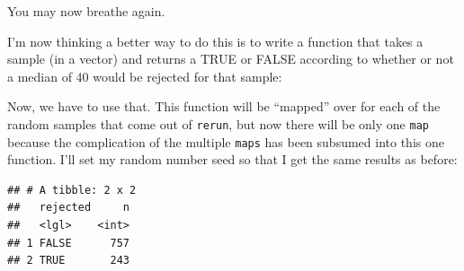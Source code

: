 \documentclass[]{tufte-book}
\newenvironment{Shaded}{}{}
\newcommand{\ControlFlowTok}[1]{\textcolor[rgb]{0.00,0.44,0.13}{\textbf{#1}}}
\newcommand{\DataTypeTok}[1]{\textcolor[rgb]{0.56,0.13,0.00}{#1}}
\newcommand{\DecValTok}[1]{\textcolor[rgb]{0.25,0.63,0.44}{#1}}
\newcommand{\KeywordTok}[1]{\textcolor[rgb]{0.00,0.44,0.13}{\textbf{#1}}}
\newcommand{\NormalTok}[1]{#1}
\newcommand{\OperatorTok}[1]{\textcolor[rgb]{0.40,0.40,0.40}{#1}}
\newcommand{\StringTok}[1]{\textcolor[rgb]{0.25,0.44,0.63}{#1}}
\theoremstyle{definition}
\theoremstyle{definition}
\theoremstyle{definition}
\theoremstyle{remark}
\begin{document}
You may now breathe again.

I'm now thinking a better way to do this is to write a function that
takes a sample (in a vector) and returns a TRUE or FALSE according to
whether or not a median of 40 would be rejected for that sample:

\begin{Shaded}
\end{Shaded}

Now, we have to use that. This function will be ``mapped'' over for each
of the random samples that come out of \texttt{rerun}, but now there
will be only one \texttt{map} because the complication of the multiple
\texttt{maps} has been subsumed into this one function. I'll set my
random number seed so that I get the same results as before:

\begin{Shaded}
\end{Shaded}

\begin{verbatim}
## # A tibble: 2 x 2
##   rejected     n
##   <lgl>    <int>
## 1 FALSE      757
## 2 TRUE       243
\end{verbatim}
\end{document}
